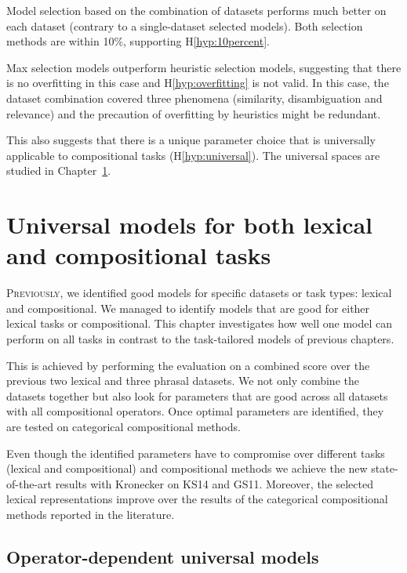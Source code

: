 Model selection based on the combination of datasets performs much better on each dataset (contrary to a single-dataset selected models). Both selection methods are within 10\%, supporting H\ref{hyp:10percent}.

Max selection models outperform heuristic selection models, suggesting that there is no overfitting in this case and H\ref{hyp:overfitting} is not valid. In this case, the dataset combination covered three phenomena (similarity, disambiguation and relevance) and the precaution of overfitting by heuristics might be redundant.

This also suggests that there is a unique parameter choice that is universally applicable to compositional tasks (H\ref{hyp:universal}). The universal spaces are studied in Chapter~\ref{sec:universal-param-selection}.

\chapter[Universal models]{Universal models for both lexical and compositional tasks}
\label{sec:universal-param-selection}

\lettrine[lines=5,loversize=0.25]{P}{reviously}, we identified good models for specific datasets or task types: lexical and compositional. We managed to identify models that are good for either lexical tasks or compositional. This chapter investigates how well one model can perform on all tasks in contrast to the task-tailored models of previous chapters.

This is achieved by performing the evaluation on a combined score over the previous two lexical and three phrasal datasets. We not only combine the datasets together but also look for parameters that are good across all datasets with all compositional operators. Once optimal parameters are identified, they are tested on categorical compositional methods.

Even though the identified parameters have to compromise over different tasks (lexical and compositional) and compositional methods we achieve the new state-of-the-art results with Kronecker on KS14 and GS11. Moreover, the selected lexical representations improve over the results of the categorical compositional methods reported in the literature.

\section{Operator-dependent universal models}
\label{sec:model-selection}

